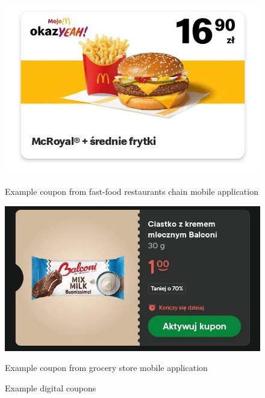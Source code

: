\documentclass[licencjacka,en]{pracamgr}
\begin{document}
\begin{figure}[h]
    \centering
    \begin{minipage}{0.45\textwidth}
        \centering
        \includegraphics[width=\linewidth]{bachelor_images/coupon1.jpg}
        \caption{Example coupon from fast-food restaurants chain mobile application}
    \end{minipage}
    \hfill
    \begin{minipage}{0.45\textwidth}
        \centering
        \includegraphics[width=\linewidth]{bachelor_images/coupon2.jpg}
        \caption{Example coupon from grocery store mobile application}
    \end{minipage}
    \caption{Example digital coupons}
    \label{fig:example_coupons}
\end{figure}
\end{document}
